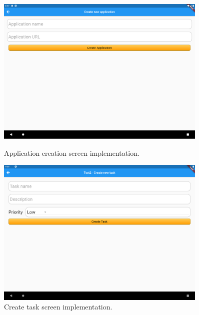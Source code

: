 \begin{figure}[H]
    \centering
    \begin{minipage}{0.45\textwidth}
        \centering
        \includegraphics[width=0.9\textwidth]{Sprint_1/images/create_app_screen_app.png}
        \caption{Application creation screen implementation.}
        \label{app_creation_screen_app}
    \end{minipage}\hfill
    \begin{minipage}{0.45\textwidth}
        \centering
        \includegraphics[width=0.9\textwidth]{Sprint_1/images/create_task_screen_app.png}
        \caption{Create task screen implementation.}
        \label{create_task_screen_app}
    \end{minipage}
\end{figure}

